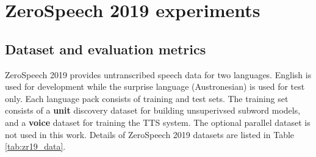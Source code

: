 \documentclass[a4paper]{article}
\begin{document}


\label{subsec:zs2017_results}

\section{ZeroSpeech 2019 experiments}
\subsection{Dataset and evaluation metrics}
ZeroSpeech 2019 \cite{zs19} provides untranscribed speech data for two languages. English is used for development while the surprise language (Austronesian) is used for test only. Each language pack consists of training and test sets. The training set consists of a \textbf{unit} discovery dataset for building unsuperivsed subword models, and a \textbf{voice} dataset for training the TTS system. The optional parallel dataset is not used in this work. Details of ZeroSpeech 2019 datasets are listed in Table \ref{tab:zr19_data}.
\begin{table}[h]
\renewcommand\arraystretch{0.6}
\centering
\caption{ZeroSpeech 2019 datasets}
\label{tab:zr19_data}
\end{table}
\end{document}
